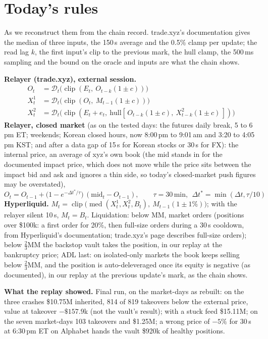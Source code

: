 \documentclass[10.5pt,a4paper]{article}
\newcommand{\med}{\operatorname{med}}
\newcommand{\clip}{\operatorname{clip}}
\newcommand{\D}{\mathcal{D}}
\newcommand{\res}[1]{\par\textbf{What the replay showed.} #1\par}
\begin{document}
\section{Today's rules}\label{sec:current}
As we reconstruct them from the chain record. trade.xyz's documentation gives the median of three inputs, the 150\,s average and the 0.5\% clamp per update; the read lag $k$, the first input's clip to the previous mark, the hull clamp, the 500\,ms sampling and the bound on the oracle and inputs are what the chain shows.

\textbf{Relayer (trade.xyz), external session.}
\begin{align}
O_t &= \D_t\big(\clip(E_t,\ O_{t-k}(1\pm c))\big)\\
X^1_t &= \D_t\big(\clip(O_t,\ M_{t-1}(1\pm c))\big) \label{eq:x1}\\
X^2_t &= \D_t\big(\clip(E_t + e_t,\ \text{hull}[\,O_{t-k}(1\pm c),\ X^2_{t-k}(1\pm c)\,])\big)
\end{align}
\textbf{Relayer, closed market} (as on the tested days: the futures daily break, 5 to 6\,pm ET; weekends; Korean closed hours, now 8:00\,pm to 9:01\,am and 3:20 to 4:05\,pm KST; and after a data gap of 15\,s for Korean stocks or 30\,s for FX): the internal price, an average of xyz's own book (the mid stands in for the documented impact price, which does not move while the price sits between the impact bid and ask and ignores a thin side, so today's closed-market push figures may be overstated),
\begin{equation}
O_t = O_{t-1} + \big(1 - e^{-\Delta t^*/\tau}\big)\,(\text{mid}_t - O_{t-1}),\qquad \tau = 30\,\text{min},\ \ \Delta t^* = \min(\Delta t, \tau/10)
\end{equation}
\textbf{Hyperliquid.} $M_t = \clip\big(\med(X^1_t, X^2_t, B_t),\ M_{t-1}(1\pm1\%)\big)$; with the relayer silent 10\,s, $M_t = B_t$.
Liquidation: below MM, market orders (positions over \$100k: a first order for 20\%, then full-size orders during a 30\,s cooldown, from Hyperliquid's documentation; trade.xyz's page describes full-size orders); below $\tfrac23$MM the backstop vault takes the position, in our replay at the bankruptcy price; ADL last: on isolated-only markets the book keeps selling below $\tfrac23$MM, and the position is auto-deleveraged once its equity is negative (as documented), in our replay at the previous update's mark, as the chain shows.
\res{Final run, on the market-days as rebuilt: on the three crashes \$10.75M inherited, 814 of 819 takeovers below the external price, value at takeover $-\$157.9$k (not the vault's result); with a stuck feed \$15.11M; on the seven market-days 103 takeovers and \$1.25M; a wrong price of $-5\%$ for 30\,s at 6:30\,pm ET on Alphabet hands the vault \$920k of healthy positions.}
\end{document}
